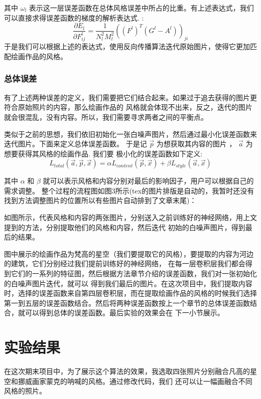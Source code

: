 \documentclass[10pt,a4paper]{ctexart}
\begin{document}
    其中 $\omega_l$ 表示这一层误差函数在总体风格误差中所占的比重。有上述表达式，我们可以直接求得误差函数的梯度的解析表达式.
	:
	\begin{equation}
	\dfrac{\partial E_l}{\partial F_{ij}^l}= \dfrac{1}{N_l^2M_l^2}((F^l)^T(G^l-A^l))_{ji}
	\end{equation}
	于是我们可以根据上述的表达式，使用反向传播算法迭代原始图片，使得它更加匹配绘画作品的风格。
	
    \subsubsection{总体误差}
    有了上述两种误差的定义，我们需要把它们结合起来。如果过于追去获得的图片更符合原始照片的内容，那么绘画作品的
    风格就会体现不出来，反之，迭代的图片就会很混乱，没有内容。所以，我们需要寻求两者之间的平衡点。

    类似于之前的思想，我们依旧初始化一张白噪声图片，然后通过最小化误差函数来迭代图片。下面来定义总体误差函数。
	于是记
    $\overrightarrow{p}$ 为想获取其内容的图片 ， $\overrightarrow{a}$ 为想要获得其风格的绘画作品. 我们要
    极小化的误差函数如下定义:
	\begin{equation}
	L_{total}(\overrightarrow{a},\overrightarrow{p},\overrightarrow{x})=\alpha L_{content}(\overrightarrow{p},\overrightarrow{x})+\beta
	L_{style}(\overrightarrow{a},\overrightarrow{x})
	\end{equation}
    
	其中 $\alpha$ 和 $\beta$ 就可以表示风格和内容分别对最后的影响因子，用户可以根据自己的需求调整。
    整个过程的流程图如图3所示(tex的图片排版是自动的，我暂时还没有找到方法调整图片的位置所以有些图片自动排到了文章末尾)：
    
    如图所示，代表风格和内容的两张图片，分别送入之前训练好的神经网络，用上文提到的方法，分别提取他们的风格和内容，然后迭代
    初始的白噪声图片，得到最后的结果。

    图中展示的绘画作品为梵高的星空（我们要提取它的风格），要提取的内容为河边的建筑，它们分别经过我们提前训练好的神经网络，
    在每一层卷积层我们都会得到它们的一系列的特征图，然后根据方法章节介绍的误差函数，我们对一张初始化的白噪声图片迭代，就可以
    得到我们最后的图片。在这次项目中，我们提取内容时，选择的误差函数来自第四层卷积层，而在提取绘画作品的风格的时候我们选择
    第一到五层的误差函数结合。然后将两种误差函数按上一个章节的总体误差函数结合，就可以得到总体的误差函数。最后实验的效果会在
    下一小节展示。
    
    
    
    \section{实验结果}
    在这次期末项目中，为了展示这个算法的效果，我选取四张照片分别融合凡高的星空和挪威画家蒙克的呐喊的风格。通过修改代码，我们 
    还可以让一幅画融合不同风格的照片。
\end{document}
